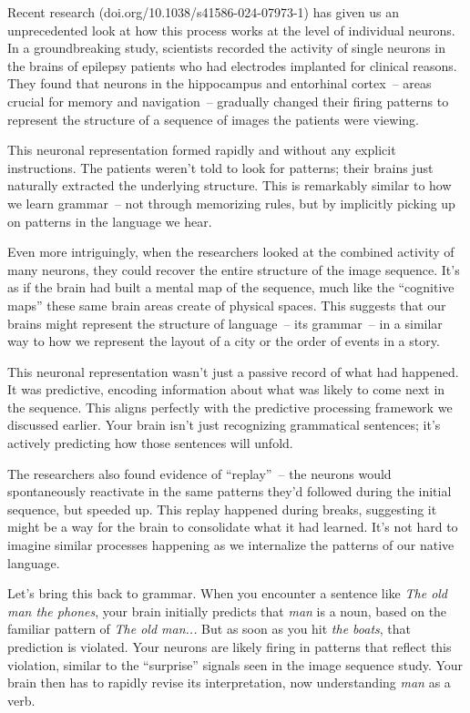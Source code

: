 Recent research (doi.org/10.1038/s41586-024-07973-1) has given us an unprecedented look at how this process works at the level of individual neurons. In a groundbreaking study, scientists recorded the activity of single neurons in the brains of epilepsy patients who had electrodes implanted for clinical reasons. They found that neurons in the hippocampus and entorhinal cortex~-- areas crucial for memory and navigation~-- gradually changed their firing patterns to represent the structure of a sequence of images the patients were viewing.

This neuronal representation formed rapidly and without any explicit instructions. The patients weren't told to look for patterns; their brains just naturally extracted the underlying structure. This is remarkably similar to how we learn grammar~-- not through memorizing rules, but by implicitly picking up on patterns in the language we hear.

Even more intriguingly, when the researchers looked at the combined activity of many neurons, they could recover the entire structure of the image sequence. It's as if the brain had built a mental map of the sequence, much like the ``cognitive maps'' these same brain areas create of physical spaces. This suggests that our brains might represent the structure of language~-- its grammar~-- in a similar way to how we represent the layout of a city or the order of events in a story.

This neuronal representation wasn't just a passive record of what had happened. It was predictive, encoding information about what was likely to come next in the sequence. This aligns perfectly with the predictive processing framework we discussed earlier. Your brain isn't just recognizing grammatical sentences; it's actively predicting how those sentences will unfold.

The researchers also found evidence of ``replay''~-- the neurons would spontaneously reactivate in the same patterns they'd followed during the initial sequence, but speeded up. This replay happened during breaks, suggesting it might be a way for the brain to consolidate what it had learned. It's not hard to imagine similar processes happening as we internalize the patterns of our native language.

Let's bring this back to grammar. When you encounter a sentence like \textit{The old man the phones}, your brain initially predicts that \textit{man} is a noun, based on the familiar pattern of \textit{The old man...} But as soon as you hit \textit{the boats}, that prediction is violated. Your neurons are likely firing in patterns that reflect this violation, similar to the ``surprise'' signals seen in the image sequence study. Your brain then has to rapidly revise its interpretation, now understanding \textit{man} as a verb.


